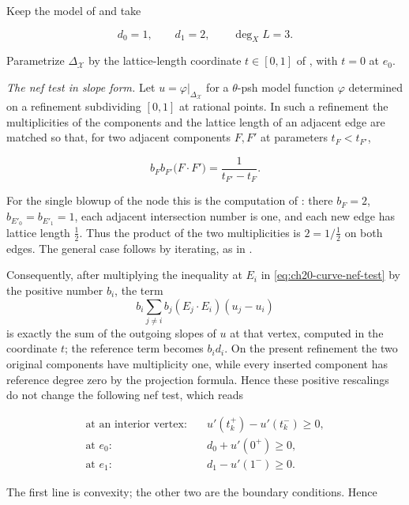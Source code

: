 \begin{example}
\label{ex:ch22-modulus-segment}
Keep the model of  and take

\[
              d_0=1,\qquad d_1=2,\qquad \deg_XL=3 .
\]

Parametrize \(\Delta_{\mathcal X}\) by the lattice-length coordinate
\(t\in[0,1]\) of , with \(t=0\) at
\(e_0\).

\emph{The nef test in slope form.}  Let \(u=\varphi|_{\Delta_{\mathcal X}}\)
for a \(\theta\)-psh model function \(\varphi\) determined on a refinement
subdividing \([0,1]\) at rational points.  In such a refinement the
multiplicities of the components and the lattice length of an adjacent edge
are matched so that, for two adjacent components \(F,F'\) at parameters
\(t_F<t_{F'}\),

\[
 b_Fb_{F'}\bigl(F\cdot F'\bigr)=\frac1{t_{F'}-t_F} .
\]

For the single blowup of the node this is the computation of
: there \(b_F=2\),
\(b_{E'_0}=b_{E'_1}=1\), each adjacent intersection number is one, and
each new edge has lattice length \(\tfrac12\).  Thus the product of the two
multiplicities is \(2=1/\tfrac12\) on both edges.  The general case follows
by iterating, as in .

Consequently, after multiplying the inequality at \(E_i\) in
\eqref{eq:ch20-curve-nef-test} by the positive number \(b_i\), the term
\[
 b_i\sum_{j\neq i}b_j(E_j\cdot E_i)(u_j-u_i)
\]
is exactly the sum of the outgoing slopes of \(u\) at that vertex, computed
in the coordinate \(t\); the reference term becomes \(b_id_i\).  On the
present refinement the two original components have multiplicity one, while
every inserted component has reference degree zero by the projection
formula.  Hence these positive rescalings do not change the following nef
test, which reads

\[
 \begin{aligned}
 \text{at an interior vertex:}&\quad
   u'(t_k^+)-u'(t_k^-)\geq0,\\
 \text{at }e_0:&\quad d_0+u'(0^+)\geq0,\\
 \text{at }e_1:&\quad d_1-u'(1^-)\geq0 .
 \end{aligned}
\tag{22.56}\label{eq:ch22-curve-slope-form}
\]

The first line is convexity; the other two are the boundary conditions.
Hence


\end{example}
